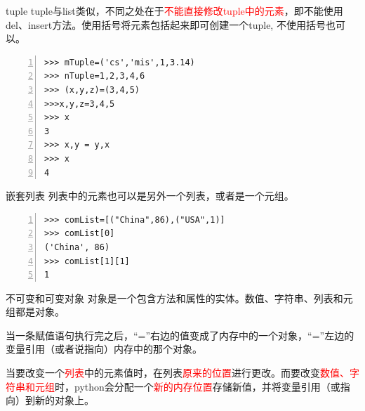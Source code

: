 \documentclass{beamer}
\begin{document}
\begin{frame}[fragile]{tuple}
tuple与list类似，不同之处在于\textcolor{red}{不能直接修改tuple中的元素}，即不能使用del、insert方法。使用括号将元素包括起来即可创建一个tuple, 不使用括号也可以。
\begin{block}{}
\begin{Verbatim}[numbers=left,frame=single,rulecolor=\color{red}]
>>> mTuple=('cs','mis',1,3.14)
>>> nTuple=1,2,3,4,6
>>> (x,y,z)=(3,4,5)
>>>x,y,z=3,4,5
>>> x
3
>>> x,y = y,x
>>> x
4
\end{Verbatim}
\end{block}

\end{frame}

\begin{frame}[fragile]{嵌套列表}
列表中的元素也可以是另外一个列表，或者是一个元组。
\begin{block}{}
\begin{Verbatim}[numbers=left,frame=single,rulecolor=\color{red}]
>>> comList=[("China",86),("USA",1)]
>>> comList[0]
('China', 86)
>>> comList[1][1]
1
\end{Verbatim}
\end{block}

\end{frame}

\begin{frame}[fragile]{不可变和可变对象}
对象是一个包含方法和属性的实体。数值、字符串、列表和元组都是对象。

当一条赋值语句执行完之后，“=”右边的值变成了内存中的一个对象，“=”左边的变量引用（或者说指向）内存中的那个对象。

当要改变一个\textcolor{red}{列表}中的元素值时，在列表\textcolor{red}{原来的位置}进行更改。而要改变\textcolor{red}{数值、字符串和元组}时，python会分配一个\textcolor{red}{新的内存位置}存储新值，并将变量引用（或指向）到新的对象上。
\end{frame}
\end{document}
